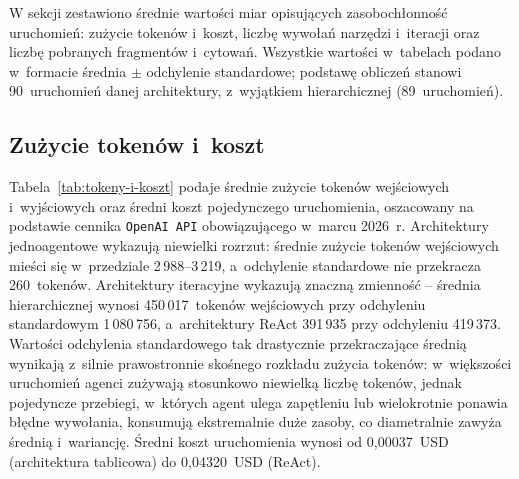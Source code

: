 W sekcji zestawiono średnie wartości miar opisujących zasobochłonność
uruchomień: zużycie tokenów i~koszt, liczbę wywołań narzędzi i~iteracji oraz
liczbę pobranych fragmentów i~cytowań. Wszystkie wartości w~tabelach podano
w~formacie średnia \(\pm\) odchylenie standardowe; podstawę obliczeń stanowi
90~uruchomień danej architektury, z~wyjątkiem hierarchicznej (89~uruchomień).

\subsection{Zużycie tokenów i~koszt}\label{subsec:zuzycie-tokenow-i-koszt}

Tabela~\ref{tab:tokeny-i-koszt} podaje średnie zużycie tokenów wejściowych
i~wyjściowych oraz średni koszt pojedynczego uruchomienia, oszacowany na
podstawie cennika \texttt{OpenAI API} obowiązującego w~marcu 2026~r.
Architektury jednoagentowe wykazują niewielki rozrzut: średnie zużycie tokenów
wejściowych mieści się w~przedziale 2\,988--3\,219, a~odchylenie standardowe
nie przekracza 260~tokenów. Architektury iteracyjne wykazują znaczną zmienność
-- średnia hierarchicznej wynosi 450\,017~tokenów wejściowych przy odchyleniu
standardowym 1\,080\,756, a~architektury ReAct 391\,935 przy odchyleniu
419\,373. Wartości odchylenia standardowego tak drastycznie przekraczające średnią
wynikają z~silnie prawostronnie skośnego rozkładu zużycia tokenów: w~większości
uruchomień agenci zużywają stosunkowo niewielką liczbę tokenów, jednak pojedyncze
przebiegi, w~których agent ulega zapętleniu lub wielokrotnie ponawia błędne
wywołania, konsumują ekstremalnie duże zasoby, co diametralnie zawyża średnią
i~wariancję. Średni koszt uruchomienia wynosi od 0{,}00037~USD (architektura
tablicowa) do 0{,}04320~USD (ReAct).

